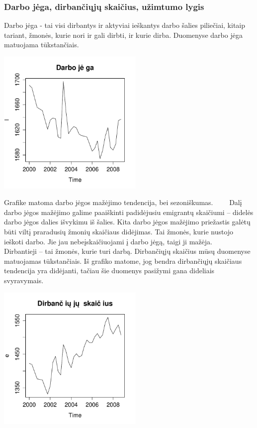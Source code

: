 \documentclass[12pt,a4paper]{article}
\theoremstyle{change}\newtheorem{salyga}{Uždavinys}
\begin{document}
\subsubsection{Darbo jėga, dirbančiųjų skaičius, užimtumo lygis}

\hspace{40pt} Darbo jėga - tai visi dirbantys ir aktyviai ieškantys darbo šalies piliečiai, kitaip tariant, žmonės, kurie nori ir gali dirbti, ir kurie dirba. Duomenyse darbo jėga matuojama tūkstančiais. 
\vskip 8pt
\begin{center}
\includegraphics[width=70mm,height=70mm]{l}
\end{center}
Grafike matoma  darbo jėgos mažėjimo tendencija, bei sezoniškumas.
\vskip 8pt
$\qquad$Dalį darbo jėgos mažėjimo galime paaiškinti padidėjusiu emigrantų skaičiumi – didelės darbo jėgos dalies išvykimu iš šalies. Kita darbo jėgos mažėjimo priežastis galėtų būti viltį praradusių žmonių skaičiaus didėjimas. Tai žmonės, kurie nustojo ieškoti darbo. Jie jau nebeįskaičiuojami į darbo jėgą, taigi ji mažėja. 
\vskip 8pt
$\qquad$Dirbantieji – tai žmonės, kurie turi darbą. Dirbančiųjų skaičius mūsų duomenyse matuojamas tūkstančiais. Iš  grafiko matome, jog bendra dirbančiųjų skaičiaus tendencija yra didėjanti, tačiau šie duomenys pasižymi gana dideliais svyravymais.
\vskip 8pt
\begin{center}
\includegraphics[width=70mm,height=70mm]{e}
\end{center}
\end{document}
